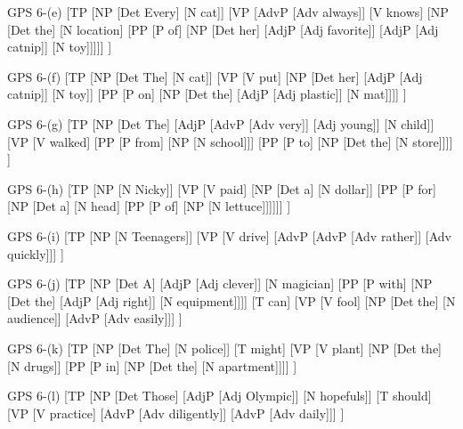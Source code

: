 \documentclass{article}
\begin{document}
\bigskip
\noindent
\begin{gpstree}[\textwidth]{GPS 6-(e)}
[TP
  [NP [Det Every] [N cat]]
  [VP [AdvP [Adv always]] [V knows] [NP [Det the] [N location] [PP [P of] [NP [Det her] [AdjP [Adj favorite]] [AdjP [Adj catnip]] [N toy]]]]]
] 
\end{gpstree}

\newpage
\noindent
\begin{gpstree}[\textwidth]{GPS 6-(f)}
[TP
  [NP [Det The] [N cat]]
  [VP [V put] [NP [Det her] [AdjP [Adj catnip]] [N toy]] [PP [P on] [NP [Det the] [AdjP [Adj plastic]] [N mat]]]]
] 
\end{gpstree}

\bigskip
\noindent
\begin{gpstree}[\textwidth]{GPS 6-(g)}
[TP
  [NP [Det The] [AdjP [AdvP [Adv very]] [Adj young]] [N child]]
  [VP [V walked] [PP [P from] [NP [N school]]] [PP [P to] [NP [Det the] [N store]]]]
] 
\end{gpstree}

\bigskip
\noindent
\begin{gpstree}[\textwidth]{GPS 6-(h)}
[TP
  [NP [N Nicky]]
  [VP [V paid] [NP [Det a] [N dollar]] [PP [P for] [NP [Det a] [N head] [PP [P of] [NP [N lettuce]]]]]]
] 
\end{gpstree}

\newpage
\noindent
\begin{gpstree}{GPS 6-(i)}
[TP
  [NP [N Teenagers]]
  [VP [V drive] [AdvP [AdvP [Adv rather]] [Adv quickly]]]
] 
\end{gpstree} \par
\bigskip
\noindent
\begin{gpstree}[\textwidth]{GPS 6-(j)}
[TP
  [NP [Det A] [AdjP [Adj clever]] [N magician] [PP [P with] [NP [Det the] [AdjP [Adj right]] [N equipment]]]]
  [T can]
  [VP [V fool] [NP [Det the] [N audience]] [AdvP [Adv easily]]]
] 
\end{gpstree} \par
\bigskip
\noindent
\begin{gpstree}[\textwidth]{GPS 6-(k)}
[TP
  [NP [Det The] [N police]]
  [T might]
  [VP [V plant] [NP [Det the] [N drugs]] [PP [P in] [NP [Det the] [N apartment]]]]
] 
\end{gpstree}

\newpage
\noindent
\begin{gpstree}[\textwidth]{GPS 6-(l)}
[TP
  [NP [Det Those] [AdjP [Adj Olympic]] [N hopefuls]]
  [T should]
  [VP [V practice] [AdvP [Adv diligently]] [AdvP [Adv daily]]]
] 
\end{gpstree}
\end{document}
